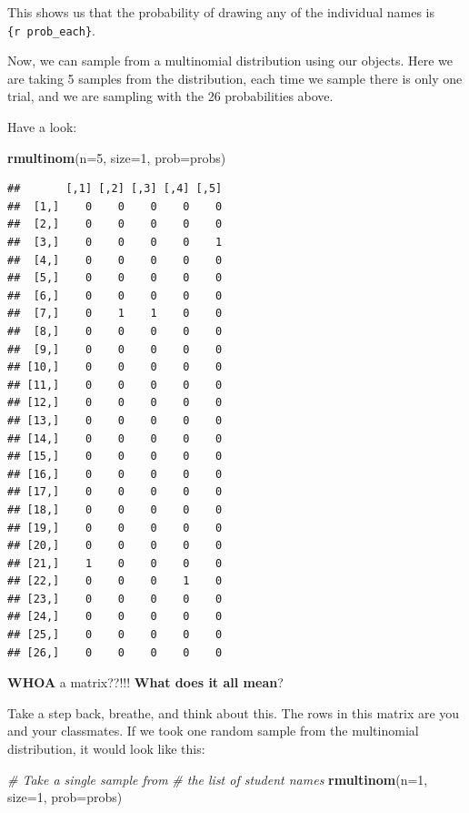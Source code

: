 \documentclass[
]{book}
\newenvironment{Shaded}{\begin{snugshade}}{\end{snugshade}}
\newcommand{\CommentTok}[1]{\textcolor[rgb]{0.56,0.35,0.01}{\textit{#1}}}
\newcommand{\DataTypeTok}[1]{\textcolor[rgb]{0.13,0.29,0.53}{#1}}
\newcommand{\DecValTok}[1]{\textcolor[rgb]{0.00,0.00,0.81}{#1}}
\newcommand{\KeywordTok}[1]{\textcolor[rgb]{0.13,0.29,0.53}{\textbf{#1}}}
\newcommand{\NormalTok}[1]{#1}
\begin{document}
This shows us that the probability of drawing any of the individual names is \texttt{\{r\ prob\_each\}}.

Now, we can sample from a multinomial distribution using our objects. Here we are taking 5 samples from the distribution, each time we sample there is only one trial, and we are sampling with the 26 probabilities above.

Have a look:

\begin{Shaded}
\begin{Highlighting}[]
\KeywordTok{rmultinom}\NormalTok{(}\DataTypeTok{n=}\DecValTok{5}\NormalTok{, }\DataTypeTok{size=}\DecValTok{1}\NormalTok{, }\DataTypeTok{prob=}\NormalTok{probs)}
\end{Highlighting}
\end{Shaded}

\begin{verbatim}
##       [,1] [,2] [,3] [,4] [,5]
##  [1,]    0    0    0    0    0
##  [2,]    0    0    0    0    0
##  [3,]    0    0    0    0    1
##  [4,]    0    0    0    0    0
##  [5,]    0    0    0    0    0
##  [6,]    0    0    0    0    0
##  [7,]    0    1    1    0    0
##  [8,]    0    0    0    0    0
##  [9,]    0    0    0    0    0
## [10,]    0    0    0    0    0
## [11,]    0    0    0    0    0
## [12,]    0    0    0    0    0
## [13,]    0    0    0    0    0
## [14,]    0    0    0    0    0
## [15,]    0    0    0    0    0
## [16,]    0    0    0    0    0
## [17,]    0    0    0    0    0
## [18,]    0    0    0    0    0
## [19,]    0    0    0    0    0
## [20,]    0    0    0    0    0
## [21,]    1    0    0    0    0
## [22,]    0    0    0    1    0
## [23,]    0    0    0    0    0
## [24,]    0    0    0    0    0
## [25,]    0    0    0    0    0
## [26,]    0    0    0    0    0
\end{verbatim}

\textbf{WHOA} a matrix??!!! \textbf{What does it all mean}?

Take a step back, breathe, and think about this. The rows in this matrix are you and your classmates. If we took one random sample from the multinomial distribution, it would look like this:

\begin{Shaded}
\begin{Highlighting}[]
\CommentTok{# Take a single sample from}
\CommentTok{# the list of student names    }
\KeywordTok{rmultinom}\NormalTok{(}\DataTypeTok{n=}\DecValTok{1}\NormalTok{, }\DataTypeTok{size=}\DecValTok{1}\NormalTok{, }\DataTypeTok{prob=}\NormalTok{probs)}
\end{Highlighting}
\end{Shaded}
\end{document}
